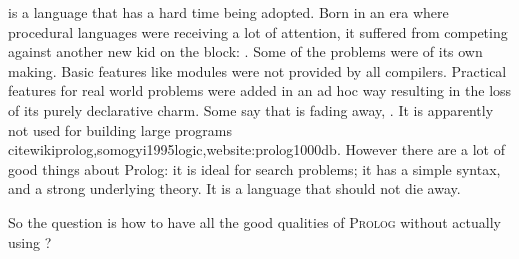 \documentclass[proposal.tex]{subfiles}
\begin{document}
\begin{comment}
\par \progLang{Prolog} has a similar story. It was born in an era where procedural programming had made everyone notice their presence. Talking about 
competition, it was against something radical; the \progLang{C} programming language. The languages \progLang{C} has influenced is off the chart and 
so is the performance. It had paved the way for structured procedural programming and had given birth to the Unix operating system. Though the 
original version of \progLang{Prolog} has given rise to a large number of different flavours but a few drawbacks remain through the bloodline and as a 
result it did become the first choice. Some basic requirements such as modules are not provided by all compilers. To make it do real world stuff, a set of 
practical features are pushed in now and then which results in the loss of the purely declarative charm. The problem is that \progLang{Prolog} is fading 
away, \cite{website:prolog-steam,website:prolog-death,website:prolog-killer}, not many people use it and most of the times when it is used, the variant 
is usually \textit{practical} \progLang{Prolog} and the area being academia. It is not used for building large programs \cite{wikiprolog,somogyi1995
logic,website:prolog1000db}. But there are a lot of good things about \progLang{Prolog} that should not die away. Moreover, \progLang{Prolog} is ideal 
for search problems. 
\end{comment}

\par {} is a language that has a hard time being adopted. Born in an era where procedural languages were receiving a lot of attention, it 
suﬀered from competing against another new kid on the block: . Some of the problems were of its own making. Basic features like modules 
were not provided by all compilers. Practical features for real world problems were added in an ad hoc way resulting in the loss of its purely declarative 
charm. Some say that  is fading away, \cite{website:prolog-steam,website:prolog-death,website:prolog-killer}. It is apparently not 
used for building large programs cite{wikiprolog,somogyi1995logic,website:prolog1000db}. However there are a lot of good things about Prolog: it is 
ideal for search problems; it has a simple syntax, and a strong underlying theory. It is a language that should not die away. 

\noindent So the question is how to have all the good qualities of \textsc{Prolog} without actually using ?  
\end{document}
